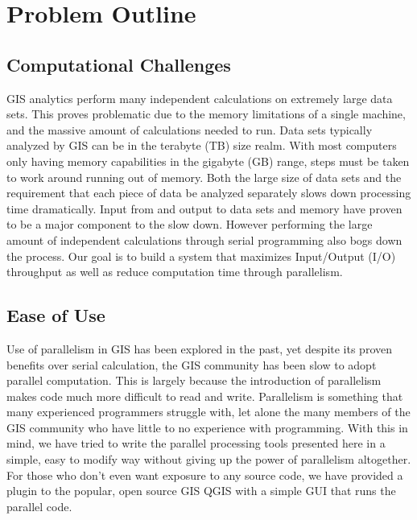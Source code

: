 \documentclass[journal]{IEEEtran}
\begin{document}
\section{Problem Outline} \label{problem}
    \subsection{Computational Challenges}
    GIS analytics perform many independent calculations on extremely large data
    sets. This proves problematic due to the memory limitations of a single
    machine, and the massive amount of calculations needed to run. Data sets 
    typically analyzed by GIS can be in the terabyte (TB) size realm. With
    most computers only having memory capabilities in the gigabyte (GB) range,
    steps must be taken to work around running out of memory. Both the large size
    of data sets and the requirement that each piece of data be analyzed separately
    slows down processing time dramatically. Input from and output to data sets
    and memory have proven to be a major component to the slow down.  However
    performing the large amount of independent calculations through serial
    programming also bogs down the process. Our goal is to build a system that
    maximizes Input/Output (I/O) throughput as well as reduce computation time
    through parallelism.

    \subsection{Ease of Use}
    Use of parallelism in GIS has been explored in the past, yet despite its proven
    benefits over serial calculation, the GIS community has been slow to adopt
    parallel computation. This is largely because the introduction of parallelism
    makes code much more difficult to read and write. Parallelism is something that
    many experienced programmers struggle with, let alone the many members of the
    GIS community who have little to no experience with programming. With this in
    mind, we have tried to write the parallel processing tools presented here in a
    simple, easy to modify way without giving up the power of parallelism
    altogether.  For those who don't even want exposure to any source code, we have
    provided a plugin to the popular, open source GIS QGIS with a simple GUI that
    runs the parallel code.
\end{document}
